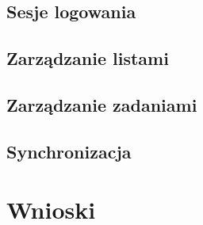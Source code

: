 \documentclass[eng,printmode]{02_class}
\begin{document}
    \section{Sesje logowania}
    \label{section:sessions}
    

    \section{Zarządzanie listami}
    \label{section:lists}
    

    \section{Zarządzanie zadaniami}
    \label{section:tasks}
    

    \section{Synchronizacja}
    \label{section:sync}
    

  \chapter{Wnioski}
  \label{chapter:conclusions}
  

  \begin{thebibliography}{plain}
    \label{bibliography}
    
  \end{thebibliography}
\end{document}
